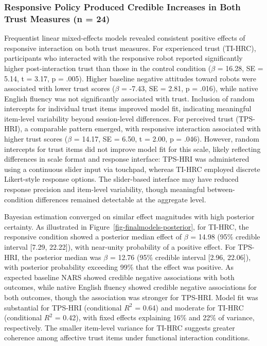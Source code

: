 \documentclass[
  authoryear,
  doubleblind,
  3p]{elsarticle}
\begin{document}
\subsubsection{Responsive Policy Produced Credible Increases in Both
Trust Measures (n =
24)}\label{responsive-policy-produced-credible-increases-in-both-trust-measures-n-24}

Frequentist linear mixed-effects models revealed consistent positive
effects of responsive interaction on both trust measures. For
experienced trust (TI-HRC), participants who interacted with the
responsive robot reported significantly higher post-interaction trust
than those in the control condition (\(\beta\) = 16.28, SE = 5.14, t =
3.17, p = .005). Higher baseline negative attitudes toward robots were
associated with lower trust scores (\(\beta\) = -7.43, SE = 2.81, p =
.016), while native English fluency was not significantly associated
with trust. Inclusion of random intercepts for individual trust items
improved model fit, indicating meaningful item-level variability beyond
session-level differences. For perceived trust (TPS-HRI), a comparable
pattern emerged, with responsive interaction associated with higher
trust scores (\(\beta\) = 14.17, SE = 6.50, t = 2.00, p = .046).
However, random intercepts for trust items did not improve model fit for
this scale, likely reflecting differences in scale format and response
interface: TPS-HRI was administered using a continuous slider input via
touchpad, whereas TI-HRC employed discrete Likert-style response
options. The slider-based interface may have reduced response precision
and item-level variability, though meaningful between-condition
differences remained detectable at the aggregate level.

Bayesian estimation converged on similar effect magnitudes with high
posterior certainty. As illustrated in
Figure~\ref{fig-finalmodels-posterior}, for TI-HRC, the responsive
condition showed a posterior median effect of \(\beta\) = 14.98 (95\%
credible interval {[}7.29, 22.22{]}), with near-unity probability of a
positive effect. For TPS-HRI, the posterior median was \(\beta\) = 12.76
(95\% credible interval {[}2.96, 22.06{]}), with posterior probability
exceeding 99\% that the effect was positive. As expected baseline NARS
showed credible negative associations with both outcomes, while native
English fluency showed credible negative associations for both outcomes,
though the association was stronger for TPS-HRI. Model fit was
substantial for TPS-HRI (conditional \(R^2\) = 0.64) and moderate for
TI-HRC (conditional \(R^2\) = 0.42), with fixed effects explaining 16\%
and 22\% of variance, respectively. The smaller item-level variance for
TI-HRC suggests greater coherence among affective trust items under
functional interaction conditions.
\end{document}
